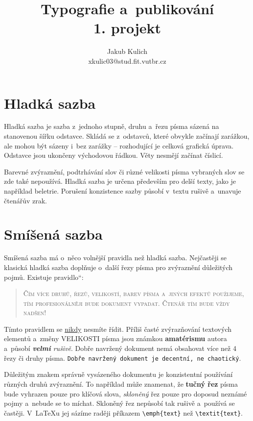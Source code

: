 \documentclass[11pt,a4paper,twocolumn]{article}
\title{Typografie a~publikování \\
        1. projekt}
\author{Jakub Kulich \\ xkulic03@stud.fit.vutbr.cz}
\newcommand{\myuv}[1]{\quotedblbase #1\textquotedblleft}
\begin{document}
\date{}
\maketitle

\section{Hladká sazba}

Hladká sazba je sazba z~jednoho stupně, druhu a~řezu písma sázená na stanovenou šířku odstavce. Skládá se z~odstavců, které obvykle začínají zarážkou, ale mohou být sázeny i~bez zarážky -- rozhodující je celková grafická úprava. Odstavce jsou ukončeny východovou řádkou. Věty nesmějí začínat číslicí.

Barevné zvýraznění, podtrhávání slov či různé velikosti písma vybraných slov se zde také nepoužívá. Hladká sazba je určena především pro delší texty, jako je například beletrie. Porušení konzistence sazby působí v~textu rušivě a~unavuje čtenářův zrak. 


\section{Smíšená sazba}

Smíšená sazba má o~něco volnější pravidla než hladká sazba. Nejčastěji se klasická hladká sazba doplňuje o~další řezy písma pro zvýraznění důležitých pojmů. Existuje \myuv{pravidlo}:

\begin{quotation}
\textsc{Čím více druhů, řezů, velikostí, barev písma a~jiných efektů použije\-me, tím profesionálněji bude  dokument vypadat. Čtenář tím bude vždy nadšen!}
\end{quotation}

Tímto pravidlem se \underline{nikdy} nesmíte řídit. Příliš časté zvýrazňování textových elementů a~změny \huge{V}\LARGE{E}\Large{L}\large{I}\normalsize{K}\small{O}\footnotesize{S}\scriptsize{T}\tiny{I} \normalsize písma \Large jsou \LARGE známkou \huge \textbf{ama\-térismu} \normalsize autora a~působí \textit{\textbf{velmi} rušivě}. Dobře navržený dokument nemá obsahovat více než 4 řezy či druhy písma. \texttt{Dobře navržený dokument je decentní, ne chaotický}.

Důležitým znakem správně vysázeného dokumentu je konzistentní používání různých druhů zvýraznění. To například může znamenat, že \textbf{tučný řez} písma bude vyhrazen pouze pro klíčová slova, \textit{skloněný} řez pouze pro doposud neznámé pojmy a~nebude se to míchat. Skloněný řez nepůsobí tak rušivě a~používá se častěji. V~\LaTeX u jej sázíme raději příkazem \verb|\emph{text}| než \verb|\textit{text}|.
\end{document}
